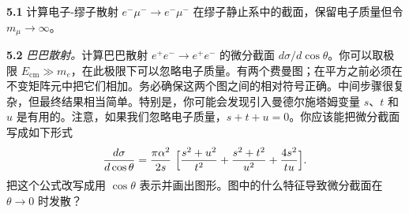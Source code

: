 \problems

\textbf{5.1} 计算电子-缪子散射 $e^{-}\mu^{-}\to e^{-}\mu^{-}$ 在缪子静止系中的截面，保留电子质量但令 $m_\mu\to\infty$。

\textbf{5.2} \emph{巴巴散射。}计算巴巴散射 $e^{+}e^{-}\to e^{+}e^{-}$ 的微分截面 $d\sigma/d\cos\theta$。你可以取极限 $E_{\mathrm{cm}} \gg m_e$，在此极限下可以忽略电子质量。有两个费曼图；在平方之前必须在不变矩阵元中把它们相加。务必确保这两个图之间的相对符号正确。中间步骤很复杂，但最终结果相当简单。特别是，你可能会发现引入曼德尔施塔姆变量 $s$、$t$ 和 $u$ 是有用的。注意，如果我们忽略电子质量，$s+t+u = 0$。你应该能把微分截面写成如下形式
\begin{equation}
  \frac{d\sigma}{d\cos\theta} = \frac{\pi\alpha^2}{2s}\ \Bigl[ \frac{s^2+u^2}
    {t^2} + \frac{s^2+t^2}{u^2} + \frac{4s^2}{tu} \Bigr] .
\end{equation}
把这个公式改写成用 $\cos\theta$ 表示并画出图形。图中的什么特征导致微分截面在 $\theta\to 0$ 时发散？

